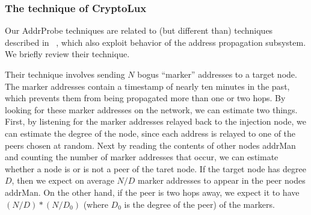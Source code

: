 \subsubsection{The technique of CryptoLux}
Our AddrProbe techniques are related to (but different than) techniques described in ~\cite{cryptolux}, which also exploit behavior of the address propagation subsystem. We briefly review their technique.

Their technique involves sending $N$ bogus ``marker'' addresses to a target node. The marker addresses contain a timestamp of nearly ten minutes in the past, which prevents them from being propagated more than one or two hops. By looking for these marker addresses on the network, we can estimate two things. First, by listening for the marker addresses relayed back to the injection node, we can estimate the degree of the node, since each address is relayed to one of the peers chosen at random. Next by reading the contents of other nodes addrMan and counting the number of marker addresses that occur, we can estimate whether a node is or is not a peer of the taret node. If the target node has degree $D$, then we expect on average $N/D$ marker addresses to appear in the peer nodes addrMan. On the other hand, if the peer is two hops away, we expect it to have $(N/D)*(N/D_0)$ (where $D_0$ is the degree of the peer) of the markers.
